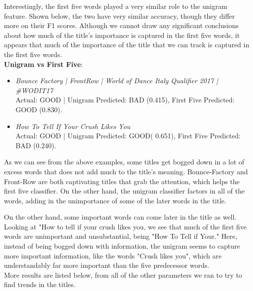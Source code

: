 \documentclass[a4paper,12pt]{article}
\begin{document}
Interestingly, the first five words played a very similar role to the unigram feature. Shown below, the two have very similar accuracy, though they differ more on their F1 scores. Although we cannot draw any significant conclusions about how much of the title's importance is captured in the first five words, it appears that much of the importance of the title that we can track is captured in the first five words.
\\

\textbf{Unigram vs First Five}:

\begin{itemize}
		\item \textit{Bounce Factory | FrontRow | World of Dance Italy Qualifier 2017 | \#WODIT17} \\
	Actual: GOOD | Unigram Predicted: BAD (0.415), First Five Predicted: GOOD (0.830).
	
	\item \textit{How To Tell If Your Crush Likes You}\\
	 Actual: GOOD | Unigram Predicted: GOOD( 0.651), First Five Predicted: BAD (0.240).
 
 \end{itemize}
 
 As we can see from the above examples, some titles get bogged down in a lot of excess words that does not add much to the title's meaning. Bounce-Factory and Front-Row are both captivating titles that grab the attention, which helps the first five classifier. On the other hand, the unigram classifier factors in all of the words, adding in the unimportance of some of the later words in the title.
 
 On the other hand, some important words can come later in the title as well. Looking at "How to tell if your crush likes you, we see that much of the first five words are unimportant and unsubstantial, being "How To Tell if Your." Here, instead of being bogged down with information, the unigram seems to capture more important information, like the words "Crush likes you", which are understandably far more important than the five predecessor words. \\
 
 More results are listed below, from all of the other parameters we ran to try to find trends in the titles.
\end{document}
